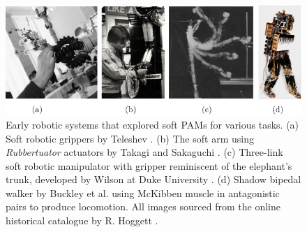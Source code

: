 \begin{figure}[!t]
  \includegraphics*[width=\textwidth]{./pdf/thesis-figure-2-5v2.pdf}
  \vspace{-5mm}
  \caption{\small Early robotic systems that explored soft PAMs for various tasks. (a) Soft robotic grippers by Teleshev \cite{Teleshev1981}. (b) The soft arm using \textit{Rubbertuator} actuators by Takagi and Sakaguchi \cite{Takagi1983}. (c) Three-link soft robotic manipulator with gripper reminiscent of the elephant's trunk, developed by Wilson at Duke University \cite{Wilson2007,Weisburd1988}. (d) Shadow bipedal walker by Buckley et al. \cite{Buckley2012} using McKibben muscle in antagonistic pairs to produce locomotion.  All images sourced from the online historical catalogue by R. Hoggett \cite{cyberneticzoo}.
  \label{fig:C0:earlyPAMrobots}}
  \vspace{-2mm}
\end{figure}
%
